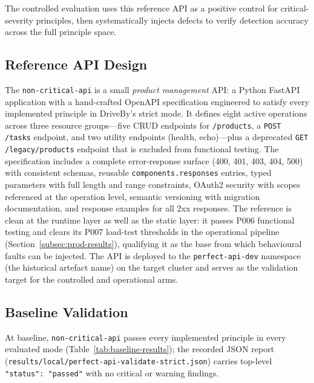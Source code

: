 The controlled evaluation uses this reference API as a positive control for critical-severity principles, then systematically injects defects to verify detection accuracy across the full principle space.

\subsection{Reference API Design}
\label{subsec:reference-api}

The \texttt{non-critical-api} is a small \emph{product management} API: a Python FastAPI application with a hand-crafted OpenAPI specification engineered to satisfy every implemented principle in DriveBy's strict mode. It defines eight active operations across three resource groups---five CRUD endpoints for \texttt{/products}, a \texttt{POST /tasks} endpoint, and two utility endpoints (health, echo)---plus a deprecated \texttt{GET /legacy/products} endpoint that is excluded from functional testing. The specification includes a complete error-response surface (400, 401, 403, 404, 500) with consistent schemas, reusable \texttt{components.responses} entries, typed parameters with full length and range constraints, OAuth2 security with scopes referenced at the operation level, semantic versioning with migration documentation, and response examples for all 2xx responses. The reference is clean at the runtime layer as well as the static layer: it passes P006 functional testing and clears its P007 load-test thresholds in the operational pipeline (Section~\ref{subsec:prod-results}), qualifying it as the base from which behavioural faults can be injected. The API is deployed to the \texttt{perfect-api-dev} namespace (the historical artefact name) on the target cluster and serves as the validation target for the controlled and operational arms.

\subsection{Baseline Validation}
\label{subsec:baseline}

At baseline, \texttt{non-critical-api} passes every implemented principle in every evaluated mode (Table~\ref{tab:baseline-results}); the recorded JSON report (\texttt{results/local/\allowbreak perfect-api-validate-strict.json}) carries top-level \texttt{"status": "passed"} with no critical or warning findings.

